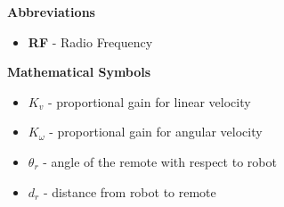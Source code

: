 
\renewcommand{\nomname}{Nomenclature}
\renewcommand{\nomAname}{\textbf{\large Abbreviations}}
\renewcommand{\nomGname}{\textbf{\large Mathematical Symbols}}
\renewcommand{\nomXname}{\textbf{\large Superscripts}}
\renewcommand{\nomZname}{\textbf{\large Subscripts}}

\printnomenclature
\cleardoublepage
{} %


\nomAname
\begin{itemize}
    \item[]\textbf{RF} - Radio Frequency
      
\end{itemize}
\bigbreak

\nomGname
\begin{itemize}
    \item[]$K_v$ - proportional gain for linear velocity
    \item[]$K_\omega$ - proportional gain for angular velocity
    \item[]$\theta_r$ - angle of the remote with respect to robot
    \item[]$d_r$ - distance from robot to remote

\end{itemize}


